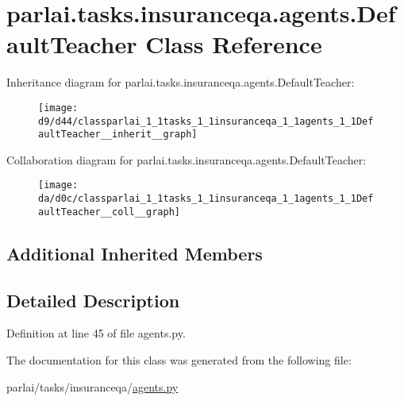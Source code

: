 \hypertarget{classparlai_1_1tasks_1_1insuranceqa_1_1agents_1_1DefaultTeacher}{}\section{parlai.\+tasks.\+insuranceqa.\+agents.\+Default\+Teacher Class Reference}
\label{classparlai_1_1tasks_1_1insuranceqa_1_1agents_1_1DefaultTeacher}


Inheritance diagram for parlai.\+tasks.\+insuranceqa.\+agents.\+Default\+Teacher\+:
\nopagebreak
\begin{figure}[H]
\begin{center}
\leavevmode
\texttt{[image: d9/d44/classparlai\_1\_1tasks\_1\_1insuranceqa\_1\_1agents\_1\_1DefaultTeacher\_\_inherit\_\_graph]}
\end{center}
\end{figure}


Collaboration diagram for parlai.\+tasks.\+insuranceqa.\+agents.\+Default\+Teacher\+:
\nopagebreak
\begin{figure}[H]
\begin{center}
\leavevmode
\texttt{[image: da/d0c/classparlai\_1\_1tasks\_1\_1insuranceqa\_1\_1agents\_1\_1DefaultTeacher\_\_coll\_\_graph]}
\end{center}
\end{figure}
\subsection*{Additional Inherited Members}


\subsection{Detailed Description}


Definition at line 45 of file agents.\+py.



The documentation for this class was generated from the following file\+:\begin{DoxyCompactItemize}
\item 
parlai/tasks/insuranceqa/\hyperlink{parlai_2tasks_2insuranceqa_2agents_8py}{agents.\+py}\end{DoxyCompactItemize}
